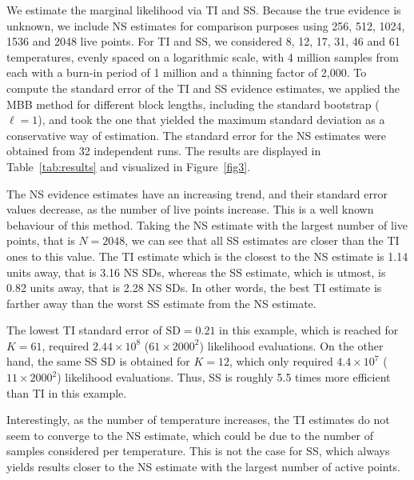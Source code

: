 \documentclass[aps,reprint,amsmath,amssymb,showpacs,showkeys]{revtex4-1}%
\newcommand{\cb}{ \color{blue}}
\begin{document}
We estimate the marginal likelihood via TI and SS.   Because the true evidence is unknown, we include NS estimates for comparison purposes  using 256, 512, 1024, 1536 and 2048 live points.  For TI and SS, we considered 8, 12, 17, 31, 46 and 61 temperatures, evenly spaced on a logarithmic scale, with 4 million samples from each with a burn-in period of 1 million and a thinning factor of 2,000.  To compute the standard error of the TI and SS evidence estimates, we applied the MBB method for different block lengths, including the standard bootstrap ($\ell =1$), and took the one that yielded the maximum standard
deviation  as a conservative way of estimation.   The standard error for the NS estimates were obtained from 32 independent runs.  The results are displayed in Table~\ref{tab:results} and visualized in Figure~\ref{fig3}.

The NS evidence estimates have an increasing trend, and their standard error values decrease, as the number of live points increase. This is a well known behaviour of this method.  Taking the NS estimate with the largest number of live points, that is $N=2048$, we can see that all SS estimates are closer than the TI ones to this value.  The TI estimate which is the closest to the NS estimate is 1.14 units away, that is 3.16 NS SDs, whereas the SS estimate, which is utmost, is 0.82 units away, that is 2.28 NS SDs.  In other words, the best TI estimate is farther away than the worst SS estimate from the NS estimate.

The lowest TI standard error of $\text{SD}=0.21$ in this example, which is reached for $K=61$, required $2.44\times10^8$ ($61\times2000^2$) likelihood evaluations.  On the other hand, the same SS SD is obtained for $K=12$, which only required $4.4\times10^7$ ($11\times2000^2$) likelihood evaluations.  Thus, SS is roughly 5.5 times more efficient than TI in this example.  %

Interestingly, as the number of temperature increases, the TI estimates do not seem  to converge to the NS estimate, which could be due to the number of samples considered per temperature.  This is not the case for SS, which always yields results closer to the NS estimate with the largest number of active points.  \\

\end{document}
